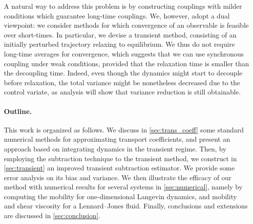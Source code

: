 A natural way to address this problem is by constructing couplings with milder conditions which guarantee long-time couplings. We, however, adopt a dual viewpoint: we consider methods for which convergence of an observable is feasible over short-times. In particular, we devise a transient method, consisting of an initially perturbed trajectory relaxing to equilibrium. We thus do not require long-time averages for convergence, 
which suggests that we can use synchronous coupling under weak conditions, provided that the relaxation time is smaller than the decoupling time. Indeed, even though the dynamics might start to decouple before relaxation, the total variance might be nonetheless decreased due to the control variate, as analysis will show that variance reduction is still obtainable.

\paragraph{Outline.} This work is organized as follows. We discuss in \cref{sec:trans_coeff} some standard numerical methods for approximating transport coefficients, and present an approach based on integrating dynamics in the transient regime. Then, by employing the subtraction technique to the transient method, we construct in \cref{sec:transient} an improved transient subtraction estimator. We provide some error analysis on its bias and variance. We then illustrate the efficacy of our method with numerical results for several systems in \cref{sec:numerical}, namely by computing the mobility for one-dimensional Langevin dynamics, and mobility and shear viscosity for a Lennard--Jones fluid. Finally, conclusions and extensions are discussed in \cref{sec:conclusion}.